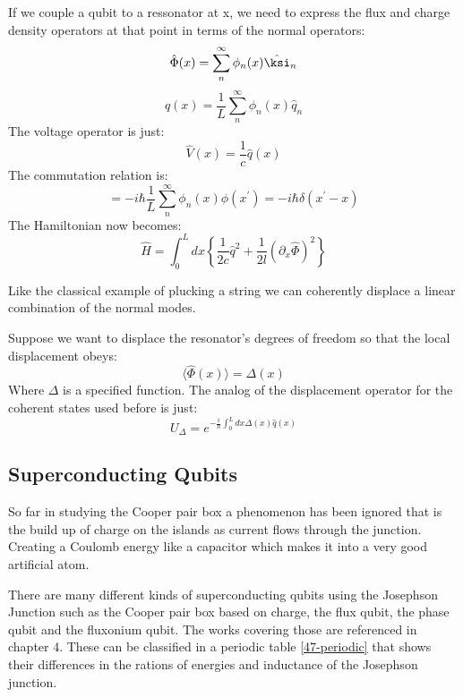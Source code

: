 \documentclass[12pt]{article}
\numberwithin{equation}{subsection}
\newcommand\ask[1]{
{%
}
}
\newcommand\page[1]{
{
}
}
\begin{document}
\page{29}
If we couple a qubit to a ressonator at x, we need to express the flux and charge density operators at that point in terms of the normal operators:
\begin{equation}
   \hat \Phi (x) = \sum^\infty_n \phi_n(x)\hat\ksi_n 
\end{equation}
\begin{equation}
   \hat q(x) = \frac{1}{L}\sum^\infty_n \phi_n(x)\hat q_n 
\end{equation}
The voltage operator is just:
\begin{equation}
    \hat V (x) = \frac{1}{c}\hat q(x)
\end{equation}
The commutation relation is:
\begin{equation}
    [\hat q(x), \hat\Phi(x^\prime)] = -i\hbar \frac{1}{L} \sum^\infty_n \phi_n(x)\phi(x^\prime) = -i\hbar \delta(x^\prime - x)
\end{equation}
The Hamiltonian now becomes:
\begin{equation}
    \hat H = \int^L_0 dx \left \{ \frac{1}{2c}\hat q^2 + \frac{1}{2l} (\partial _x \hat \Phi)^2\right\}
\end{equation}
\ask{Eu não entendi o porque e o como dele chegar nessa equação de onda quantica}
\page{30}
Like the classical example of plucking a string we can coherently displace a linear combination of the normal modes.

Suppose we want to displace the resonator's degrees of freedom so that the local displacement obeys: 
\begin{equation}
    \langle \hat \Phi (x)\rangle = \Delta (x)
\end{equation}
Where $\Delta$ is a specified function. The analog of the displacement operator for the coherent states used before is just:
\begin{equation}
    U_\Delta = e^{-\frac{i}{\hbar}\int^L_0 dx \Delta(x)\hat q(x)}
\end{equation}

\page{44}
\subsection{Superconducting Qubits}
So far in studying the Cooper pair box a phenomenon has been ignored that is the build up of charge on the islands as current flows through the junction. Creating a Coulomb energy like a capacitor which makes it into a very good artificial atom.

There are many different kinds of superconducting qubits using the Josephson Junction such as the Cooper pair box based on charge, the flux qubit, the phase qubit and the fluxonium qubit. The works covering those are referenced in \cite{Girvin2015CircuitQS} chapter 4. These can be classified in a periodic table \ref{47-periodic} that shows their differences in the rations of energies and inductance of the Josephson junction.
\end{document}
